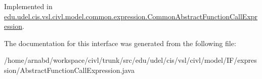 Implemented in \hyperlink{classedu_1_1udel_1_1cis_1_1vsl_1_1civl_1_1model_1_1common_1_1expression_1_1CommonAbstractFunctionCallExpression_a23e117274e46b3f83cdee749af562ae8}{edu.\+udel.\+cis.\+vsl.\+civl.\+model.\+common.\+expression.\+Common\+Abstract\+Function\+Call\+Expression}.



The documentation for this interface was generated from the following file\+:\begin{DoxyCompactItemize}
\item 
/home/arnabd/workspace/civl/trunk/src/edu/udel/cis/vsl/civl/model/\+I\+F/expression/Abstract\+Function\+Call\+Expression.\+java\end{DoxyCompactItemize}
